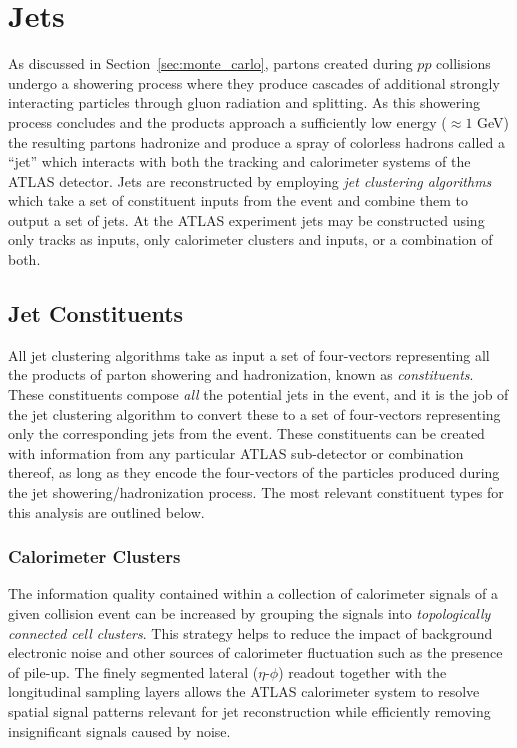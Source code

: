 \graphicspath{{Ch4_Jets/figures/}}

\chapter{Jets}
As discussed in Section~\ref{sec:monte_carlo}, partons created during $pp$ collisions undergo a showering process where they produce cascades of additional strongly interacting particles through gluon radiation and splitting.
As this showering process concludes and the products approach a sufficiently low energy ($\approx 1$ GeV) the resulting partons hadronize and produce a spray of colorless hadrons called a ``jet'' which interacts with both the tracking and calorimeter systems of the ATLAS detector.
Jets are reconstructed by employing \textit{jet clustering algorithms} which take a set of constituent inputs from the event and combine them to output a set of jets.
At the ATLAS experiment jets may be constructed using only tracks as inputs, only calorimeter clusters and inputs, or a combination of both.

\section{Jet Constituents}
\label{sec:jet_constituents}
All jet clustering algorithms take as input a set of four-vectors representing all the products of parton showering and hadronization, known as \textit{constituents}.
These constituents compose \textit{all} the potential jets in the event, and it is the job of the jet clustering algorithm to convert these to a set of four-vectors representing only the corresponding jets from the event.
These constituents can be created with information from any particular ATLAS sub-detector or combination thereof, as long as they encode the four-vectors of the particles produced during the jet showering/hadronization process.
The most relevant constituent types for this analysis are outlined below.

\subsection{Calorimeter Clusters}
The information quality contained within a collection of calorimeter signals of a given collision event can be increased by grouping the signals into \textit{topologically connected cell clusters}.
This strategy helps to reduce the impact of background electronic noise and other sources of calorimeter fluctuation such as the presence of pile-up.
The finely segmented lateral ($\eta$-$\phi$) readout together with the longitudinal sampling layers allows the ATLAS calorimeter system to resolve spatial signal patterns relevant for jet reconstruction while efficiently removing insignificant signals caused by noise.

